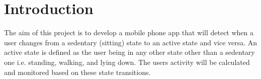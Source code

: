 \chapter{Introduction} %
\label{cha:introduction}

The aim of this project is to develop a mobile phone app that will detect when a user changes from a sedentary (sitting) state to an active state and vice versa. An active state is defined as the user being in any other state other than a sedentary one i.e. standing, walking, and lying down. The users activity will be calculated and monitored based on these state transitions.


